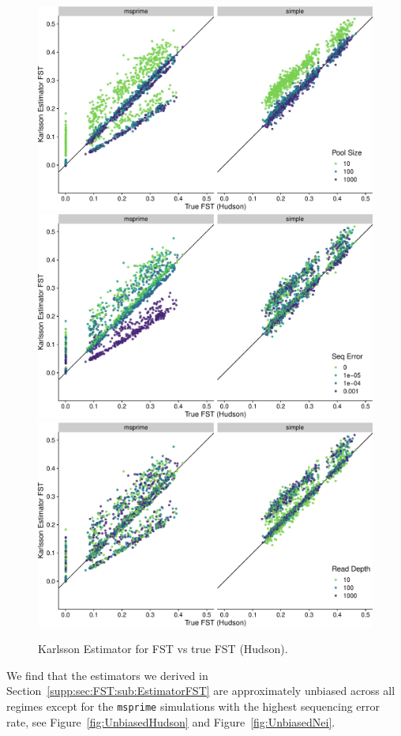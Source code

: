 \documentclass[a4paper,fontsize=9pt,DIV=14]{scrartcl}
\newcommand\figref[1]{Figure~\ref{#1}}
\begin{document}
\begin{figure}[p]
    \centering
    \includegraphics[width=.75\linewidth]{true_hudson_fst-est_karlsson-pool_size.pdf}
    \includegraphics[width=.75\linewidth]{true_hudson_fst-est_karlsson-seq_error.pdf}
    \includegraphics[width=.75\linewidth]{true_hudson_fst-est_karlsson-read_depth.pdf}
    \vspace*{-1em}
    \caption{
        Karlsson Estimator for FST vs true FST (Hudson).
    }
\label{fig:Karlsson}
\end{figure}

We find that the estimators we derived in Section~\ref{supp:sec:FST:sub:EstimatorFST} are approximately unbiased across all regimes except for the \texttt{msprime} simulations with the highest sequencing error rate, see \figref{fig:UnbiasedHudson} and \figref{fig:UnbiasedNei}.
\end{document}
